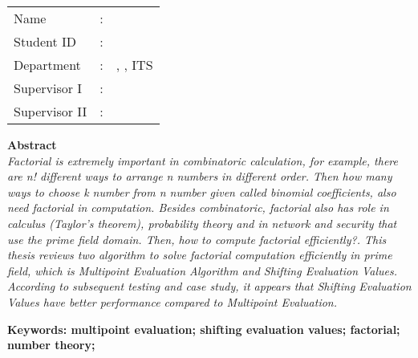 \begin{tabularx}{\linewidth}{ l l p{2.2in} }
	Name 			& : & \penulis \\
	Student ID		& :	& \nrp \\
	Department 		& : & \jurusaneng, \newline \fakultaseng, ITS \\
	Supervisor I 	& : & \pembimbingsatu \\
	Supervisor II 	& : & \pembimbingdua
	\vspace*{1em} 	%
\end {tabularx}
	
\noindent\textbf{Abstract} \\
\itshape
Factorial is extremely important in combinatoric calculation, for example, there are n! different ways to arrange n numbers in different order. Then how many ways to choose k number from n number given called binomial coefficients, also need factorial in computation. Besides combinatoric, factorial also has role in calculus (Taylor's theorem), probability theory and in network and security that use the prime field domain. Then, how to compute factorial efficiently?. This thesis reviews two algorithm to solve factorial computation efficiently in prime field, which is Multipoint Evaluation Algorithm and Shifting Evaluation Values. According to subsequent testing and case study, it appears that Shifting Evaluation Values have better performance compared to Multipoint Evaluation.

\vspace*{1em}
\noindent\bfseries Keywords:  multipoint evaluation; shifting evaluation values; factorial; number theory;
\normalfont
\cleardoublepage